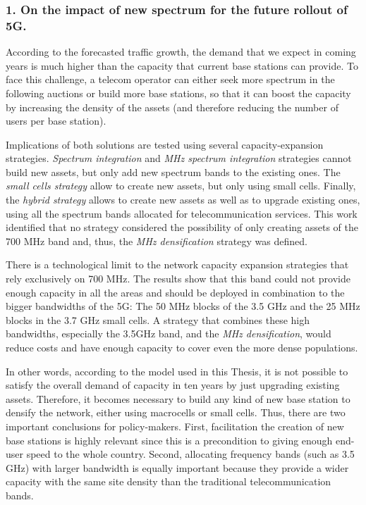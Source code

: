 \subsubsection*{1. On the impact of new spectrum for the future rollout of 5G.}
According to the forecasted traffic growth, the demand that we expect in coming years is much higher than the capacity that current base stations can provide. To face this challenge, a telecom operator can either seek more spectrum in the following auctions or build more base stations, so that it can boost the capacity by increasing the density of the assets (and therefore reducing the number of users per base station).\par

Implications of both solutions are tested using several capacity-expansion strategies. \textit{\guillemotleft Spectrum integration\guillemotright } and \textit{ MHz spectrum integration\guillemotright } strategies cannot build new assets, but only add new spectrum bands to the existing ones. The \textit{\guillemotleft small cells strategy\guillemotright } allow to create new assets, but only using small cells. Finally, the \textit{\guillemotleft hybrid strategy\guillemotright } allows to create new assets as well as to upgrade existing ones, using all the spectrum bands allocated for telecommunication services. This work identified that no strategy considered the possibility of only creating assets of the 700 MHz band and, thus, the \textit{ MHz densification\guillemotright } strategy was defined. \par

There is a technological limit to the network capacity expansion strategies that rely exclusively on 700 MHz. The results show that this band could not provide enough capacity in all the areas and should be deployed in combination to the bigger bandwidths of the 5G: The 50 MHz blocks of the 3.5 GHz and the 25 MHz blocks in the 3.7 GHz small cells. A strategy that combines these high bandwidths, especially the 3.5GHz band, and the \textit{ MHz densification\guillemotright }, would reduce costs and have enough capacity to cover even the more dense populations. \par

In other words, according to the model used in this Thesis, it is not possible to satisfy the overall demand of capacity in ten years by just upgrading existing assets. Therefore, it becomes necessary to build any kind of new base station to densify the network, either using macrocells or small cells. Thus, there are two important conclusions for policy-makers. First, facilitation the creation of new base stations is highly relevant since this is a precondition to giving enough end-user speed to the whole country. Second, allocating frequency bands (such as 3.5 GHz) with larger bandwidth is equally important because they provide a wider capacity with the same site density than the traditional telecommunication bands.\par








